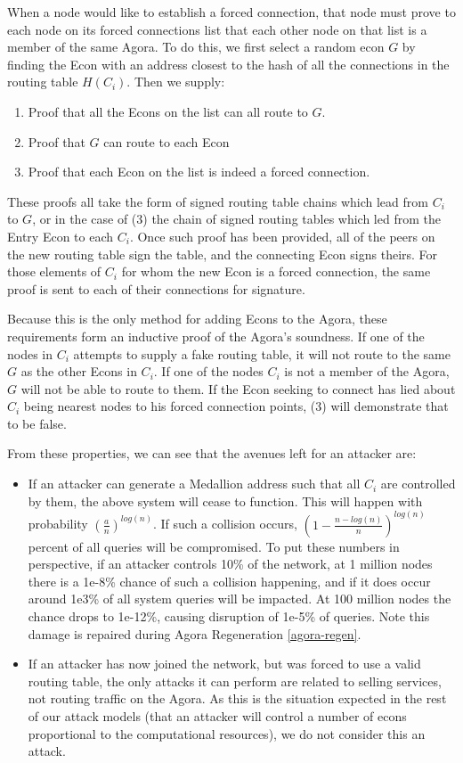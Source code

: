 When a node would like to establish a forced connection, that node must prove to each node on its forced connections list that each other node on that list is a member of the same Agora. To do this, we first select a random econ $G$ by finding the Econ with an address closest to the hash of all the connections in the routing table $H(C_i)$. Then we supply:

\begin{enumerate}
\item Proof that all the Econs on the list can all route to $G$.
\item Proof that $G$ can route to each Econ
\item Proof that each Econ on the list is indeed a forced connection.
\end{enumerate}

These proofs all take the form of signed routing table chains which lead from $C_i$ to $G$, or in the case of (3) the chain of signed routing tables which led from the Entry Econ to each $C_i$. Once such proof has been provided, all of the peers on the new routing table sign the table, and the connecting Econ signs theirs. For those elements of $C_i$ for whom the new Econ is a forced connection, the same proof is sent to each of their connections for signature.

Because this is the only method for adding Econs to the Agora, these requirements form an inductive proof of the Agora's soundness. If one of the nodes in $C_i$ attempts to supply a fake routing table, it will not route to the same $G$ as the other Econs in $C_i$. If one of the nodes $C_i$ is not a member of the Agora, $G$ will not be able to route to them. If the Econ seeking to connect has lied about $C_i$ being nearest nodes to his forced connection points, (3) will demonstrate that to be false.

From these properties, we can see that the avenues left for an attacker are:

\begin{itemize}
\item If an attacker can generate a Medallion address such that all $C_i$ are controlled by them, the above system will cease to function. This will happen with probability $(\frac{a}{n})^{log(n)}$. If such a collision occurs, $(1 - \frac{n-log(n)}{n})^{log(n)}$ percent of all queries will be compromised. To put these numbers in perspective, if an attacker controls 10\% of the network, at 1 million nodes there is a 1e-8\% chance of such a collision happening, and if it does occur around 1e3\% of all system queries will be impacted. At 100 million nodes the chance drops to 1e-12\%, causing disruption of 1e-5\% of queries. Note this damage is repaired during Agora Regeneration \ref{agora-regen}.
\item If an attacker has now joined the network, but was forced to use a valid routing table, the only attacks it can perform are related to selling services, not routing traffic on the Agora. As this is the situation expected in the rest of our attack models (that an attacker will control a number of econs proportional to the computational resources), we do not consider this an attack.
\end{itemize}

